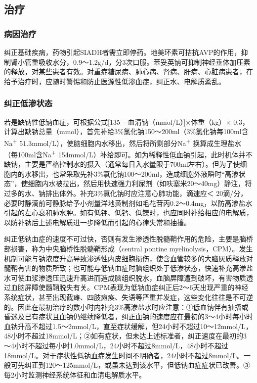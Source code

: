 \subsection{治疗}

\subsubsection{病因治疗}

纠正基础疾病，药物引起SIADH者需立即停药。地美环素可拮抗AVP的作用，抑制肾小管重吸收水分，0.9～1.2g/d，分3次口服。苯妥英钠可抑制神经垂体加压素的释放，对某些患者有效。对重症糖尿病、肺心病、肾病、肝病、心脏病患者，在给予治疗时，应随时警惕和防止医源性低渗血症，纠正水、电解质紊乱。

\subsubsection{纠正低渗状态}

若是缺钠性低钠血症，可根据公式{[}135 −血清钠（mmol/L）{]}×体重（kg）×
0.3，计算出缺钠总量（mmol），首先补给3\%氯化钠150～200ml（3\%氯化钠每100ml含Na\textsuperscript{+}
51.3mmol/L），使脑细胞内水移出，然后将所剩部分Na\textsuperscript{+}
换算成生理盐水（每100ml含Na\textsuperscript{+}
154mmol/L）补给即可。如为稀释性低血钠引起，此时机体并不缺钠，主要是严格控制水的摄入（通常每日入水量限于700ml左右）。但为了使细胞内的水移出，也常采取先补3\%氯化钠100～200ml，造成细胞外液瞬时“高渗状态”，使细胞内水被拉出，然后用快速强力利尿剂（如呋塞米20～40mg）静注，将过多的水、钠排出体外。补充3\%氯化钠时应注意心肺功能，滴速应＜
20滴/分，必要时静滴前可静脉给予小剂量洋地黄制剂如毛花苷丙0.2～0.4mg，以防高渗盐水引起的左心衰和肺水肿。如有低钾、低钙、低镁时，也应同时补给相应的电解质，以防补钠后上述电解质进一步降低而引起的心律失常和抽搐。

纠正低钠血症的速度不可过快，否则有发生渗透性脱髓鞘作用的危险，主要是脑桥部损害，称为中央脑桥性脱髓鞘形成（central
pontine
myelinolysis，CPM）。发生机制可能与钠浓度升高导致渗透性内皮细胞损伤，使含血管较多的大脑灰质释放对髓鞘有害的物质所致；也可能与低钠血症时脑组织处于低渗状态，快速补充高渗盐水可使血浆渗透压迅速升高进而造成脑组织脱水，血脑屏障遭到破坏，有害物质透过血脑屏障使髓鞘脱失有关。CPM表现为低钠血症纠正后2～6天出现严重的神经系统症状，甚至出现截瘫、四肢瘫痪、失语等严重并发症，这些变化往往是不可逆的。因此在最初治疗的数小时内补充3\%高渗盐水时应注意：①低血钠伴有抽搐或昏迷及已有症状且血钠仍继续降低者，纠正血钠的速度应在最初的3～4小时每小时血钠升高不超过1.5～2mmol/L，直至症状缓解，但24小时不超过10～12mmol/L，48小时不超过18mmol/L；②如有症状，但未达上述标准者，纠正速度在最初的3～4小时不超过每小时1.0mmol/L，24小时不超过8mmol/L，48小时不超过18mmol/L。对于症状性低钠血症发生时间不明确者，24小时不超过8mmol/L。一般可先纠正到120～125mmol/L，或虽未达到该水平，但低钠血症症状已改善。③每2小时监测神经系统体征和血清电解质水平。

